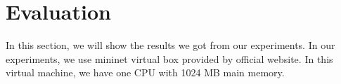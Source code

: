 \section{Evaluation} \label{sec:evaluation}

In this section, we will show the results we got from our experiments.
In our experiments, we use mininet virtual box provided by official website\cite{Mininet:official}. 
In this virtual machine, we have one CPU with 1024 MB main memory.
